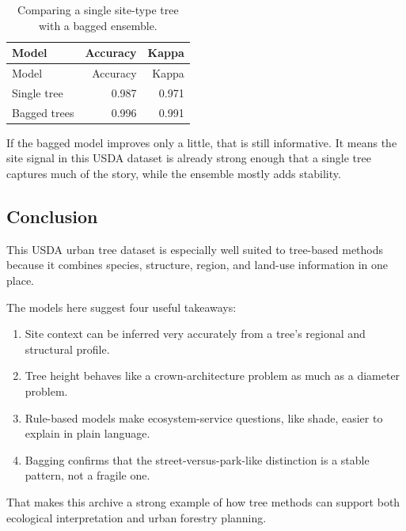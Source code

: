 \documentclass[
  11pt,
]{article}
\providecommand{\tightlist}{%
  \setlength{\itemsep}{0pt}\setlength{\parskip}{0pt}}
\begin{document}
\begin{longtable}[]{@{}lrr@{}}
\caption{Comparing a single site-type tree with a bagged
ensemble.}\tabularnewline
\toprule\noalign{}
Model & Accuracy & Kappa \\
\midrule\noalign{}
\endfirsthead
\toprule\noalign{}
Model & Accuracy & Kappa \\
\midrule\noalign{}
\endhead
\bottomrule\noalign{}
\endlastfoot
Single tree & 0.987 & 0.971 \\
Bagged trees & 0.996 & 0.991 \\
\end{longtable}

If the bagged model improves only a little, that is still informative.
It means the site signal in this USDA dataset is already strong enough
that a single tree captures much of the story, while the ensemble mostly
adds stability.

\subsection{Conclusion}\label{conclusion}

This USDA urban tree dataset is especially well suited to tree-based
methods because it combines species, structure, region, and land-use
information in one place.

The models here suggest four useful takeaways:

\begin{enumerate}
\def\labelenumi{\arabic{enumi}.}
\tightlist
\item
  Site context can be inferred very accurately from a tree's regional
  and structural profile.
\item
  Tree height behaves like a crown-architecture problem as much as a
  diameter problem.
\item
  Rule-based models make ecosystem-service questions, like shade, easier
  to explain in plain language.
\item
  Bagging confirms that the street-versus-park-like distinction is a
  stable pattern, not a fragile one.
\end{enumerate}

That makes this archive a strong example of how tree methods can support
both ecological interpretation and urban forestry planning.
\end{document}

